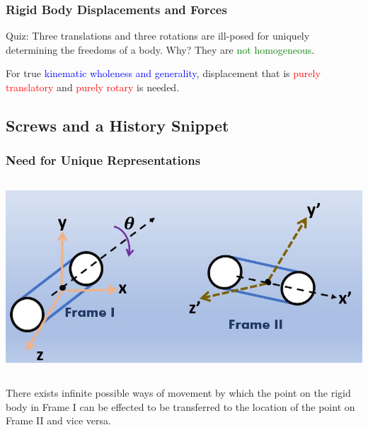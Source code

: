 \begin{frame}
	\frametitle{Rigid Body Displacements and Forces}
	\begin{tcolorbox}[top=0mm, title=Inhomogeneity of Displacements and Angles]
		Quiz: Three translations and three rotations are ill-posed for uniquely determining the freedoms of a body. Why?
		\tcblower
		They are \textcolor{green}{not homogeneous}. 
		\begin{description}
			\item For true \textcolor{blue}{kinematic wholeness and generality}, displacement that is \textcolor{red}{purely translatory} and \textcolor{red}{purely rotary} is needed.
		\end{description}
	\end{tcolorbox}
\end{frame}


\subsection{Screws and a History Snippet}


\begin{frame}
	\frametitle{Need for Unique Representations}
	\begin{columns}[b]
		\begin{column}{.75\linewidth}
			\centering
			\includegraphics[width=\textwidth]{figures/need4screws.jpg}
		\end{column}
	\end{columns}
	\footnotesize{There exists infinite possible ways of movement by which the point on the rigid body in Frame I can be effected to be transferred to the location of the point on Frame II and vice versa.}
\end{frame}



